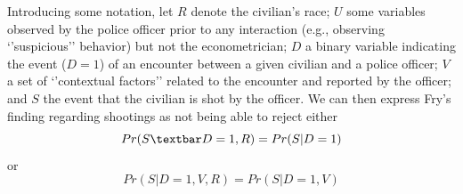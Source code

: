 \documentclass[11pt]{exam}
\begin{document}
Introducing some notation, let \(R\) denote the civilian's race; \(U\)
some variables observed by the police officer prior to any interaction
(e.g., observing `'suspicious'' behavior) but not the econometrician;
\(D\) a binary variable indicating the event (\(D = 1\)) of an encounter
between a given civilian and a police officer; \(V\) a set of
`'contextual factors'' related to the encounter and reported by the
officer; and \(S\) the event that the civilian is shot by the officer.
We can then express Fry's finding regarding shootings as not being able
to reject either
\begin{equation}
Pr(S\textbar D = 1, R) = Pr(S | D = 1)
\end{equation}
or
\begin{equation}
Pr(S | D = 1,V,R) = Pr(S | D = 1,V)
\end{equation}
\end{document}
